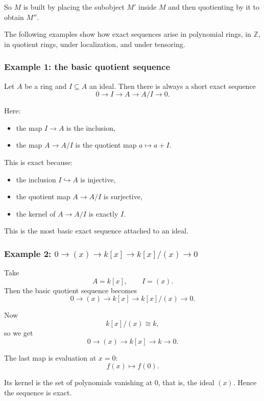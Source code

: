 \documentclass[12pt,a4paper]{article}
\theoremstyle{notespace}
\theoremstyle{definition}
\begin{document}
So \(M\) is built by placing the subobject \(M'\) inside \(M\) and then quotienting by it to obtain \(M''\).

The following examples show how exact sequences arise in polynomial rings, in \(\mathbb Z\), in quotient rings, under localization, and under tensoring.

\subsubsection{Example 1: the basic quotient sequence}

Let \(A\) be a ring and \(I\subseteq A\) an ideal. Then there is always a short exact sequence
\[
0 \longrightarrow I \longrightarrow A \longrightarrow A/I \longrightarrow 0.
\]

Here:

\begin{itemize}
	\item the map \(I\to A\) is the inclusion,
	\item the map \(A\to A/I\) is the quotient map \(a\mapsto a+I\).
\end{itemize}

This is exact because:

\begin{itemize}
	\item the inclusion \(I\hookrightarrow A\) is injective,
	\item the quotient map \(A\to A/I\) is surjective,
	\item the kernel of \(A\to A/I\) is exactly \(I\).
\end{itemize}

This is the most basic exact sequence attached to an ideal.

\subsubsection{Example 2: \(0\to (x)\to k[x]\to k[x]/(x)\to 0\)}

Take
\[
A=k[x],
\qquad
I=(x).
\]
Then the basic quotient sequence becomes
\[
0 \longrightarrow (x) \longrightarrow k[x] \longrightarrow k[x]/(x) \longrightarrow 0.
\]

Now
\[
k[x]/(x)\cong k,
\]
so we get
\[
0 \longrightarrow (x) \longrightarrow k[x] \longrightarrow k \longrightarrow 0.
\]

The last map is evaluation at \(x=0\):
\[
f(x)\longmapsto f(0).
\]

Its kernel is the set of polynomials vanishing at \(0\), that is, the ideal \((x)\). Hence the sequence is exact.
\end{document}
